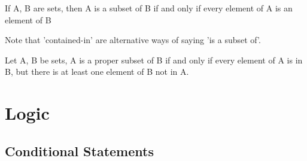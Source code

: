 \documentclass{article}
\begin{document}
\begin{definition}\label{def:subset-txt}
If A, B are sets, then A is a subset of B if and only if every element of A is an element of B
\end{definition}


Note that 'contained-in' are alternative ways of saying 'is a subset of'.

\begin{definition}\label{def:proper-subset-txt}
Let A, B be sets, A is a proper subset of B if and only if every element of A is in B, but there
is at least one element of B not in A.
\end{definition}



\section{Logic}







\subsection{Conditional Statements}
\end{document}
